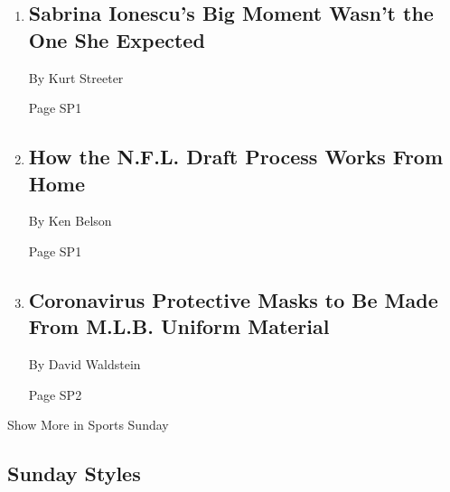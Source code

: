 \begin{enumerate}
\def\labelenumi{\arabic{enumi}.}
\item
  \href{/2020/03/28/sports/sabrina-ionescu-oregon-wnba.html}{}

  \hypertarget{sabrina-ionescus-big-moment-wasnt-the-one-she-expected}{%
  \subsection{Sabrina Ionescu's Big Moment Wasn't the One She
  Expected}\label{sabrina-ionescus-big-moment-wasnt-the-one-she-expected}}

  By Kurt Streeter

  Page SP1
\item
  \href{/2020/03/27/sports/football/nfl-draft-coronavirus.html}{}

  \hypertarget{how-the-nfl-draft-process-works-from-home}{%
  \subsection{How the N.F.L. Draft Process Works From
  Home}\label{how-the-nfl-draft-process-works-from-home}}

  By Ken Belson

  Page SP1
\item
  \href{/2020/03/26/sports/baseball/coronavirus-masks-gowns-mlb-uniforms.html}{}

  \hypertarget{coronavirus-protective-masks-to-be-made-from-mlb-uniform-material}{%
  \subsection{Coronavirus Protective Masks to Be Made From M.L.B.
  Uniform
  Material}\label{coronavirus-protective-masks-to-be-made-from-mlb-uniform-material}}

  By David Waldstein

  Page SP2
\end{enumerate}

Show More in Sports Sunday

\hypertarget{sunday-styles}{%
\subsection{Sunday Styles}\label{sunday-styles}}

